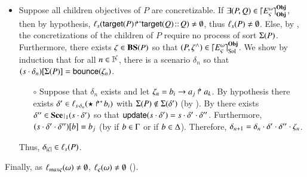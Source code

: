\begin{proofapproxinf}
\begin{itemize}
  \item Suppose all children objectives of $P$ are concretizable.
    If $\exists (P, Q) \in \lceil E_\varsigma^\omega\rceil^{\mathbf{Obj}}_{\mathbf{Obj}}$, then by hypothesis,
      $\ell_{s}({\mathsf{target}(P)\!\Rsh^*\!\!\mathsf{target}(Q)} \!::\! Q) \neq \emptyset$, thus
      $\ell_{s}(P) \neq \emptyset$.
    Else, by , the concretizations of the children of $P$ require no process of sort $\Sigma(P)$.
      Furthermore, there exists $\zeta \in \mathbf{BS}(P)$ so that $(P, \zeta^\wedge) \in \lceil E_\varsigma^\omega\rceil^{\mathbf{Obj}}_{\mathrm{Sol}}$.
      We show by induction that for all $n \in \mathbb{I}^{\zeta}$, there is a scenario $\delta_n$ so that ${(s \cdot \delta_n)[\Sigma(P)]} = \mathsf{bounce}(\zeta_n)$.
      \begin{itemize}
        \item[$\circ$] Suppose that $\delta_n$ exists and let $\zeta_n = b_i\rightarrow a_j\Rsh a_k$.
        By hypothesis there exists $\delta' \in \ell_{s \cdot \delta_n}(\mbox{$\star\Rsh^*\!b_i$})$ with $\Sigma(P) \notin \Sigma(\delta')$ (by ).
        By  there exists $\delta'' \in \restriction{\Sce}{1}(s \PHplay \delta')$ so that $\mathsf{update}(s \cdot \delta') = s \cdot \delta' \cdot \delta''$.
        Furthermore, ${(s \cdot \delta' \cdot \delta'')[b]} = b_j$ (by  if $b \in \Gamma$ or  if $b \in \Delta$).
        Therefore, $\delta_{n+1} = \delta_n \cdot \delta' \cdot \delta'' \cdot \zeta_n$.
      \end{itemize}
      Thus, $\delta_{|\zeta|} \in \ell_s(P)$. %
\end{itemize}
Finally, as $\ell_{max\varsigma}(\omega) \neq \emptyset$, $\ell_\varsigma(\omega) \neq \emptyset$ ().
\end{proofapproxinf}
